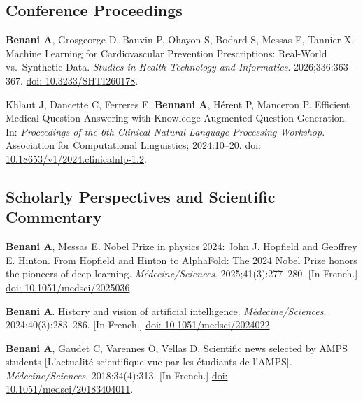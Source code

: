 \documentclass[10pt,letterpaper]{article}
\newcommand{\doi}[1]{\href{https://doi.org/#1}{doi: #1}}
\newcommand{\me}{\textbf{Benani A}}
\begin{document}
\subsection{Conference Proceedings}
\begin{pubs}[resume]
\item \me, Grosgeorge D, Bauvin P, Ohayon S, Bodard S, Messas E, Tannier X. Machine Learning for Cardiovascular Prevention Prescriptions: Real-World vs.\ Synthetic Data. \textit{Studies in Health Technology and Informatics}. 2026;336:363--367. \doi{10.3233/SHTI260178}.
\item Khlaut J, Dancette C, Ferreres E, \textbf{Bennani A}, Hérent P, Manceron P. Efficient Medical Question Answering with Knowledge-Augmented Question Generation. In: \textit{Proceedings of the 6th Clinical Natural Language Processing Workshop}. Association for Computational Linguistics; 2024:10--20. \doi{10.18653/v1/2024.clinicalnlp-1.2}.
\end{pubs}

\subsection{Scholarly Perspectives and Scientific Commentary}
\begin{pubs}[resume]
\item \me, Messas E. Nobel Prize in physics 2024: John J. Hopfield and Geoffrey E. Hinton. From Hopfield and Hinton to AlphaFold: The 2024 Nobel Prize honors the pioneers of deep learning. \textit{Médecine/Sciences}. 2025;41(3):277--280. [In French.] \doi{10.1051/medsci/2025036}.
\item \me. History and vision of artificial intelligence. \textit{Médecine/Sciences}. 2024;40(3):283--286. [In French.] \doi{10.1051/medsci/2024022}.
\item \me, Gaudet C, Varennes O, Vellas D. Scientific news selected by AMPS students [L'actualité scientifique vue par les étudiants de l'AMPS]. \textit{Médecine/Sciences}. 2018;34(4):313. [In French.] \doi{10.1051/medsci/20183404011}.
\end{pubs}
\end{document}
